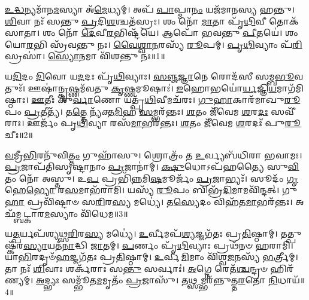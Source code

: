 \clearpage
{}
\setcounter{anuvakam}{0}

\-\ul{𑌉}\-\-\ul{𑌦𑍍𑌧}\-𑌨𑍍𑌯𑌮𑌾᳴𑌨\-\ul{𑌮}\-𑌸𑍍𑌯𑌾 𑌅᳴\-\ul{𑌮𑍇}\-𑌧𑍍𑌯𑌮𑍍।
𑌅𑌪᳴ \ul{𑌪𑌾}\-𑌪𑍍𑌮𑌾\-\ul{𑌨𑌂} 𑌯𑌜᳴𑌮𑌾𑌨𑌸𑍍𑌯 𑌹𑌨𑍍𑌤𑍁।
\-\ul{𑌶𑌿}\-𑌵𑌾 𑌨𑌃᳴ 𑌸𑌨𑍍𑌤𑍁 \ul{𑌪𑍍𑌰}\-𑌦𑌿\-\ul{𑌶}\-𑌶𑍍𑌚𑌤᳴𑌸𑍍𑌰𑌃।
𑌶𑌂 𑌨𑍋᳴ \ul{𑌮𑌾}\-𑌤𑌾 𑌪𑍃᳴\-\ul{𑌥𑌿}\-𑌵𑍀 𑌤𑍋𑌕᳴𑌸𑌾𑌤𑌾।
𑌶𑌂 𑌨𑍋᳴ \ul{𑌦𑍇}\-𑌵𑍀\-\ul{𑌰}\-𑌭𑌿𑌷𑍍𑌟᳴𑌯𑍇।
𑌆𑌪𑍋᳴ 𑌭𑌵𑌨𑍍𑌤𑍁 \ul{𑌪𑍀}\-𑌤𑌯𑍇॑।
𑌶𑌂 𑌯𑍋\-\ul{𑌰}\-𑌭𑌿 𑌸𑍍𑌰᳴𑌵𑌨𑍍𑌤𑍁 𑌨𑌃।
\-\ul{𑌵𑍈}\-\-\ul{𑌶𑍍𑌵𑌾}\-\-\ul{𑌨}\-𑌰𑌸𑍍𑌯᳴ \ul{𑌰𑍂}\-𑌪𑌮𑍍।
\-\ul{𑌪𑍃}\-\-\ul{𑌥𑌿}\-𑌵𑍍𑌯𑌾𑌂 𑌪᳴\-\ul{𑌰𑌿}\-𑌸𑍍𑌰𑌸𑌾॑।
\-\ul{𑌸𑍍𑌯𑍋}\-𑌨𑌮𑌾 𑌵𑌿᳴𑌶𑌨𑍍𑌤𑍁 𑌨𑌃॥1॥

𑌯\-\ul{𑌦𑌿}\-𑌦𑌂 \ul{𑌦𑌿}\-𑌵𑍋 𑌯\-\ul{𑌦}\-𑌦𑌃 𑌪𑍃᳴\-\ul{𑌥𑌿}\-𑌵𑍍𑌯𑌾𑌃।
\-\ul{𑌸}\-\-\ul{𑌞𑍍𑌜}\-\-\ul{𑌜𑍍𑌞𑌾}\-𑌨𑍇 𑌰𑍋𑌦᳴𑌸𑍀 𑌸𑌮𑍍𑌬\-\ul{𑌭𑍂}\-𑌵𑌤𑍁𑌃᳴।
𑌊𑌷𑌾॑\-\ul{𑌨𑍍𑌕𑍃}\-𑌷𑍍𑌣𑌮᳴𑌵𑌤𑍁 \ul{𑌕𑍃}\-𑌷𑍍𑌣𑌮𑍂𑌷𑌾𑌃॑।
\-\ul{𑌇}\-𑌹𑍋𑌭𑌯𑍋॑\-\ul{𑌰𑍍𑌯}\-𑌜𑍍𑌞𑌿\-\ul{𑌯}\-\-𑌮𑌾𑌗᳴𑌮𑌿𑌷𑍍𑌠𑌾𑌃।
\-\ul{𑌊}\-𑌤𑍀𑌃 𑌕𑍁᳴\-\ul{𑌰𑍍𑌵𑌾}\-𑌣𑍋 𑌯𑌤𑍍𑌪𑍃᳴\-\ul{𑌥𑌿}\-𑌵𑍀𑌮𑌚᳴𑌰𑌃।
\-\ul{𑌗𑍁}\-\-\ul{𑌹𑌾}\-𑌕𑌾𑌰᳴𑌮𑌾𑌖𑍁\-\ul{𑌰𑍂}\-𑌪𑌂 \ul{𑌪𑍍𑌰}\-𑌤𑍀𑌤𑍍𑌯᳴।
𑌤\-\ul{𑌤𑍍𑌤𑍇} 𑌨𑍍𑌯᳴𑌕𑍍𑌤\-\ul{𑌮𑌿}\-𑌹 \ul{𑌸}\-𑌮𑍍𑌭𑌰᳴𑌨𑍍𑌤𑌃।
\-\ul{𑌶}\-𑌤𑌂 𑌜𑍀᳴𑌵𑍇𑌮 \ul{𑌶}\-𑌰\-\ul{𑌦𑌃} 𑌸𑌵𑍀᳴𑌰𑌾𑌃।
𑌊𑌰𑍍𑌜𑌂᳴ 𑌪𑍃\-\ul{𑌥𑌿}\-𑌵𑍍𑌯𑌾 𑌰𑌸᳴\-\ul{𑌮𑌾}\-𑌭𑌰᳴𑌨𑍍𑌤𑌃।
\-\ul{𑌶}\-𑌤𑌂 𑌜𑍀᳴𑌵𑍇𑌮 \ul{𑌶}\-𑌰𑌦𑌃᳴ 𑌪𑍁\-\ul{𑌰𑍂}\-𑌚𑍀𑌃॥2॥

\-\ul{𑌵}\-𑌮𑍍𑌰𑍀\-\ul{𑌭𑌿}\-𑌰𑌨𑍁᳴\-𑌵𑌿\-\ul{𑌤𑍍𑌤𑌂} 𑌗𑍁𑌹𑌾᳴𑌸𑍁।
𑌶𑍍𑌰𑍋𑌤𑍍𑌰𑌂᳴ 𑌤 \ul{𑌉}\-𑌰𑍍𑌵𑍍𑌯𑌬᳴𑌧𑌿𑌰𑌾 𑌭𑌵𑌾𑌮𑌃।
\-\ul{𑌪𑍍𑌰}\-𑌜𑌾𑌪᳴𑌤𑌿𑌸𑍃𑌷𑍍𑌟𑌾𑌨𑌾𑌂 \ul{𑌪𑍍𑌰}\-𑌜𑌾𑌨𑌾॑𑌮𑍍।
\-\ul{𑌕𑍍𑌷𑍁}\-𑌧𑍋\-𑌽𑌪᳴𑌹𑌤𑍍𑌯𑍈 𑌸𑍁\-\ul{𑌵𑌿}\-𑌤𑌂 𑌨𑍋᳴ 𑌅𑌸𑍍𑌤𑍁।
𑌉\-\ul{𑌪} 𑌪𑍍𑌰𑌭𑌿᳴\-\ul{𑌨𑍍𑌨}\-𑌮𑌿\-\ul{𑌷}\-𑌮𑍂𑌰𑍍𑌜𑌂᳴ \ul{𑌪𑍍𑌰}\-𑌜𑌾𑌭𑍍𑌯𑌃᳴।
𑌸𑍂𑌦𑌂᳴ \ul{𑌗𑍃}\-𑌹𑍇\-\ul{𑌭𑍍𑌯𑍋} 𑌰\-\ul{𑌸}\-𑌮𑌾𑌭᳴𑌰𑌾𑌮𑌿।
𑌯𑌸𑍍𑌯᳴ \ul{𑌰𑍂}\-𑌪𑌂 𑌬𑌿𑌭𑍍𑌰᳴\-\ul{𑌦𑌿}\-𑌮𑌾𑌮𑌵𑌿᳴𑌨𑍍𑌦𑌤𑍍।
𑌗𑍁\-\ul{𑌹𑌾} 𑌪𑍍𑌰𑌵𑌿᳴𑌷𑍍𑌟𑌾𑍞 𑌸\-\ul{𑌰𑌿}\-𑌰\-\ul{𑌸𑍍𑌯} 𑌮𑌧𑍍𑌯𑍇॑।
𑌤\-\ul{𑌸𑍍𑌯𑍇}\-𑌦𑌂 𑌵𑌿𑌹᳴𑌤\-\ul{𑌮𑌾}\-𑌭𑌰᳴𑌨𑍍𑌤𑌃।
𑌅𑌛᳴𑌮𑍍𑌬𑌟𑍍𑌕𑌾𑌰\-\ul{𑌮}\-𑌸𑍍𑌯𑌾𑌂 𑌵𑌿᳴𑌧𑍇𑌮॥3॥

𑌯\-\ul{𑌤𑍍𑌪}\-𑌰𑍍𑌯𑌪᳴𑌶𑍍𑌯𑌥𑍍𑌸\-\ul{𑌰𑌿}\-𑌰\-\ul{𑌸𑍍𑌯} 𑌮𑌧𑍍𑌯𑍇॑।
\-\ul{𑌉}\-𑌰𑍍𑌵𑍀𑌮𑌪᳴\-\ul{𑌶𑍍𑌯}\-𑌜𑍍𑌜𑌗᳴𑌤𑌃 𑌪𑍍𑌰\-\ul{𑌤𑌿}\-𑌷𑍍𑌠𑌾𑌮𑍍।
𑌤𑌤𑍍𑌪𑍁𑌷𑍍𑌕᳴𑌰\-\ul{𑌸𑍍𑌯𑌾}\-𑌯𑌤᳴\-\ul{𑌨𑌾}\-𑌦𑍍𑌧𑌿 \ul{𑌜𑌾}\-𑌤𑌮𑍍।
\-\ul{𑌪}\-𑌰𑍍𑌣𑌂 𑌪𑍃᳴\-\ul{𑌥𑌿}\-𑌵𑍍𑌯𑌾𑌃 𑌪𑍍𑌰𑌥᳴𑌨𑍞 𑌹𑌰𑌾𑌮𑌿।
𑌯𑌾\-\ul{𑌭𑌿}\-𑌰𑌦𑍃𑍞᳴\-\ul{𑌹}\-𑌜𑍍𑌜𑌗᳴𑌤𑌃 𑌪𑍍𑌰\-\ul{𑌤𑌿}\-𑌷𑍍𑌠𑌾𑌮𑍍।
\-\ul{𑌉}\-𑌰𑍍𑌵𑍀\-\ul{𑌮𑌿}\-𑌮𑌾𑌂 𑌵𑌿᳴𑌶𑍍𑌵\-\ul{𑌜}\-𑌨𑌸𑍍𑌯᳴ \ul{𑌭}\-𑌰𑍍𑌤𑍍𑌰𑍀𑌮𑍍।
𑌤𑌾 𑌨𑌃᳴ \ul{𑌶𑌿}\-𑌵𑌾𑌃 𑌶𑌰𑍍𑌕᳴𑌰𑌾𑌃 𑌸\-\ul{𑌨𑍍𑌤𑍁} 𑌸𑌰𑍍𑌵𑌾𑌃॑।
\-\ul{𑌅}\-𑌗𑍍𑌨𑍇 𑌰𑍇𑌤᳴\-\ul{𑌶𑍍𑌚}\-𑌨𑍍𑌦𑍍𑌰𑍞 𑌹𑌿𑌰᳴𑌣𑍍𑌯𑌮𑍍।
\-\ul{𑌅}\-𑌦𑍍𑌭𑍍𑌯𑌃 𑌸𑌮𑍍𑌭𑍂᳴𑌤\-\ul{𑌮}\-𑌮𑍃𑌤𑌂᳴ \ul{𑌪𑍍𑌰}\-𑌜𑌾𑌸𑍁᳴।
𑌤\-\ul{𑌥𑍍𑌸}\-𑌮𑍍𑌭𑌰᳴𑌨𑍍𑌨𑍁𑌤𑍍𑌤\-\ul{𑌰}\-𑌤𑍋 \ul{𑌨𑌿}\-𑌧𑌾𑌯᳴॥4॥

